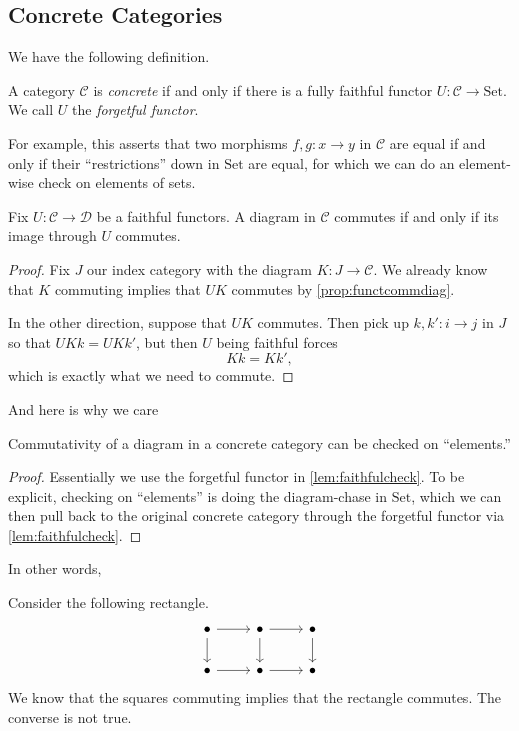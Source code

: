\subsection{Concrete Categories}
We have the following definition.
\begin{definition}[Concrete]
	A category $\mathcal C$ is \textit{concrete} if and only if there is a fully faithful functor $U:\mathcal C\to\mathrm{Set}$. We call $U$ the \textit{forgetful functor}.
\end{definition}
For example, this asserts that two morphisms $f,g:x\to y$ in $\mathcal C$ are equal if and only if their ``restrictions'' down in $\mathrm{Set}$ are equal, for which we can do an element-wise check on elements of sets.
\begin{lemma} \label{lem:faithfulcheck}
	Fix $U:\mathcal C\to\mathcal D$ be a faithful functors. A diagram in $\mathcal C$ commutes if and only if its image through $U$ commutes.
\end{lemma}
\begin{proof}
	Fix $J$ our index category with the diagram $K:J\to\mathcal C$. We already know that $K$ commuting implies that $UK$ commutes by \autoref{prop:functcommdiag}.

	In the other direction, suppose that $UK$ commutes. Then pick up $k,k':i\to j$ in $J$ so that $UKk=UKk'$, but then $U$ being faithful forces
	\[Kk=Kk',\]
	which is exactly what we need to commute.
\end{proof}
And here is why we care
\begin{corollary}
	Commutativity of a diagram in a concrete category can be checked on ``elements.''
\end{corollary}
\begin{proof}
	Essentially we use the forgetful functor in \autoref{lem:faithfulcheck}. To be explicit, checking on ``elements'' is doing the diagram-chase in $\mathrm{Set}$, which we can then pull back to the original concrete category through the forgetful functor via \autoref{lem:faithfulcheck}.
\end{proof}
In other words, 
\begin{warn} \label{warn:rect}
	Consider the following rectangle.
	\[\begin{tikzcd}
		\bullet & \bullet & \bullet \\
		\bullet & \bullet & \bullet
		\arrow[from=1-1, to=1-2]
		\arrow[from=1-2, to=2-2]
		\arrow[from=2-1, to=2-2]
		\arrow[from=1-1, to=2-1]
		\arrow[from=1-2, to=1-3]
		\arrow[from=2-2, to=2-3]
		\arrow[from=1-3, to=2-3]
	\end{tikzcd}\]
	We know that the squares commuting implies that the rectangle commutes. The converse is not true.
\end{warn}
